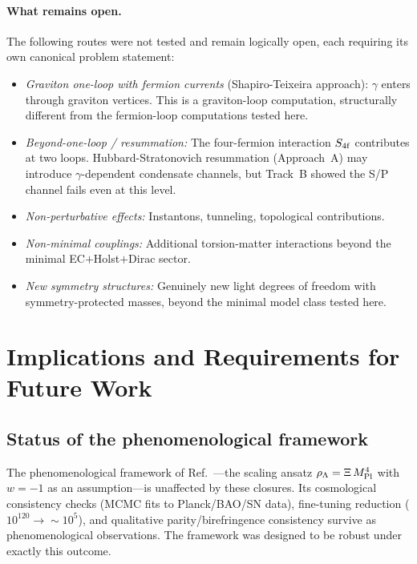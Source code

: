\documentclass[11pt,letterpaper]{article}
\newcommand{\MPl}{M_{\rm Pl}}
\newcommand{\BI}{\gamma}               %
\newcommand{\Sfour}{S_{\rm 4f}}
\begin{document}
\paragraph{What remains open.}
The following routes were not tested and remain logically open, each
requiring its own canonical problem statement:
\begin{itemize}
  \item \emph{Graviton one-loop with fermion currents}
    (Shapiro-Teixeira approach): $\BI$ enters through graviton vertices.
    This is a graviton-loop computation, structurally different from the
    fermion-loop computations tested here.
  \item \emph{Beyond-one-loop / resummation:} The four-fermion interaction
    $\Sfour$ contributes at two loops. Hubbard-Stratonovich resummation
    (Approach~A) may introduce $\BI$-dependent condensate channels, but
    Track~B showed the S/P channel fails even at this level.
  \item \emph{Non-perturbative effects:} Instantons, tunneling, topological
    contributions.
  \item \emph{Non-minimal couplings:} Additional torsion-matter interactions
    beyond the minimal EC$+$Holst$+$Dirac sector.
  \item \emph{New symmetry structures:} Genuinely new light degrees of
    freedom with symmetry-protected masses, beyond the minimal model
    class tested here.
\end{itemize}


\section{Implications and Requirements for Future Work}\label{sec:implications}

\subsection{Status of the phenomenological framework}

The phenomenological framework of Ref.~\cite{Golden2026}---the scaling ansatz
$\rho_\Lambda = \Xi\,\MPl^4$ with $w=-1$ as an assumption---is unaffected by
these closures. Its cosmological consistency checks (MCMC fits to
Planck/BAO/SN data), fine-tuning reduction ($10^{120} \to {\sim}10^5$), and
qualitative parity/birefringence consistency survive as phenomenological
observations. The framework was designed to be robust under exactly this
outcome.
\end{document}
